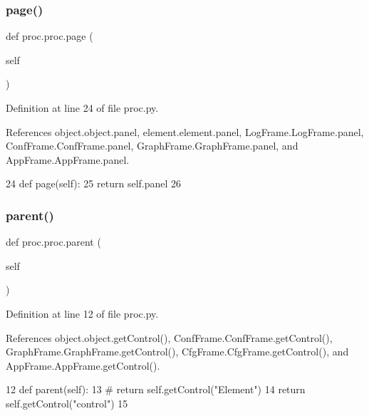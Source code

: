 \subsubsection{\texorpdfstring{page()}{page()}}
{\footnotesize\ttfamily def proc.\+proc.\+page (\begin{DoxyParamCaption}\item[{}]{self }\end{DoxyParamCaption})\hspace{0.3cm}{\ttfamily [inherited]}}



Definition at line 24 of file proc.\+py.



References object.\+object.\+panel, element.\+element.\+panel, Log\+Frame.\+Log\+Frame.\+panel, Conf\+Frame.\+Conf\+Frame.\+panel, Graph\+Frame.\+Graph\+Frame.\+panel, and App\+Frame.\+App\+Frame.\+panel.


\begin{DoxyCode}
24     \textcolor{keyword}{def }page(self):
25         \textcolor{keywordflow}{return} self.panel
26 \end{DoxyCode}
\mbox{\label{classproc_1_1proc_a997ae1c4cc88dfe9e361897bf471ca0f}} 
\subsubsection{\texorpdfstring{parent()}{parent()}}
{\footnotesize\ttfamily def proc.\+proc.\+parent (\begin{DoxyParamCaption}\item[{}]{self }\end{DoxyParamCaption})\hspace{0.3cm}{\ttfamily [inherited]}}



Definition at line 12 of file proc.\+py.



References object.\+object.\+get\+Control(), Conf\+Frame.\+Conf\+Frame.\+get\+Control(), Graph\+Frame.\+Graph\+Frame.\+get\+Control(), Cfg\+Frame.\+Cfg\+Frame.\+get\+Control(), and App\+Frame.\+App\+Frame.\+get\+Control().


\begin{DoxyCode}
12     \textcolor{keyword}{def }parent(self):
13 \textcolor{comment}{#        return self.getControl("Element")   }
14         \textcolor{keywordflow}{return} self.getControl(\textcolor{stringliteral}{"control"})
15 
\end{DoxyCode}
\mbox{\label{classEmulateFE_1_1EmulateFE_aefc7339cfc727ad13e3307761ff72795}} 

